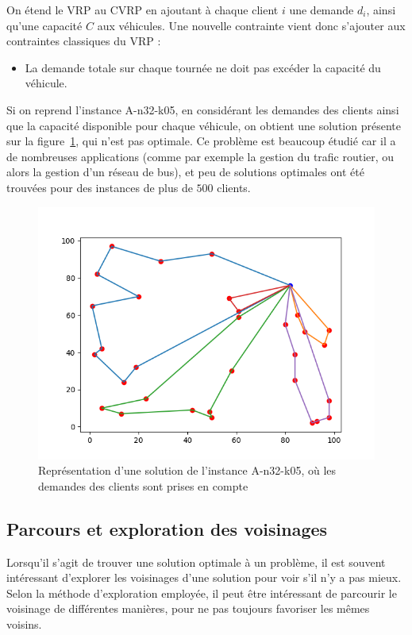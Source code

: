 \documentclass[a4paper,11pt]{article}%
\begin{document}
On étend le VRP au CVRP en ajoutant à chaque client $i$ une demande $d_i$, ainsi qu'une capacité $C$ aux véhicules.
Une nouvelle contrainte vient donc s'ajouter aux contraintes classiques du VRP :
\begin{itemize}
\item La demande totale sur chaque tournée ne doit pas excéder la capacité du véhicule.
\end{itemize}
Si on reprend l'instance A-n32-k05, en considérant les demandes des clients ainsi que la capacité disponible pour chaque véhicule, on obtient une solution présente sur la figure~\ref{SC3205}, qui n'est pas optimale. 
Ce problème est beaucoup étudié car il a de nombreuses applications (comme par exemple la gestion du trafic routier, ou alors la gestion d'un réseau de bus), et peu de solutions optimales ont été trouvées pour des instances de plus de $500$ clients. 

\begin{figure}
\centering
\includegraphics[scale=0.5]{solutionCapacity.png}
\caption{Représentation d'une solution de l'instance A-n32-k05, où les demandes des clients sont prises en compte}
\label{SC3205}
\end{figure}

\subsection{Parcours et exploration des voisinages}
\label{voisinage}

Lorsqu'il s'agit de trouver une solution optimale à un problème, il est souvent intéressant d'explorer les voisinages d'une solution pour voir s'il n'y a pas mieux. Selon la méthode d'exploration employée, il peut être intéressant de parcourir le voisinage de différentes manières, pour ne pas toujours favoriser les mêmes voisins.
\end{document}
